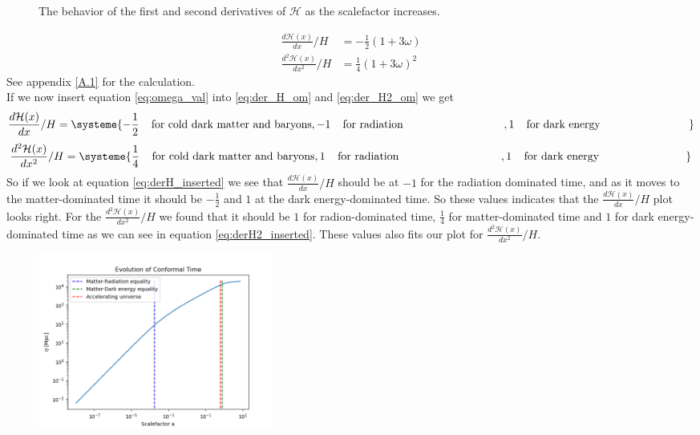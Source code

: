 \documentclass{article}
\begin{document}
\begin{multicols}{2}
\begin{figure}[H]
	\caption{The behavior of the first and second derivatives of $\mathcal{H}$ as the scalefactor increases.}
	\label{fig:der_Hp(x)}
\end{figure}
\begin{align}
    \frac{d\mathcal{H}(x)}{dx}/H&=-\frac{1}{2}(1+3\omega) \label{eq:der_H_om}\\
    \frac{d^2\mathcal{H}(x)}{dx^2}/H&=\frac{1}{4}(1+3\omega)^2 \label{eq:der_H2_om}
\end{align}
See appendix \eqref{A.1} for the calculation.\\
If we now insert equation \eqref{eq:omega_val} into \eqref{eq:der_H_om} and \eqref{eq:der_H2_om} we get
\begin{equation}
\frac{d\mathcal{H}(x)}{dx}/H=
\systeme{
  -\frac{1}{2}\;\;\;\; \text{for cold dark matter and baryons},
  -1\;\;\;\; \text{for radiation} \;\;\;\;\;\;\;\;\;\;\;\;\;\;\;\;\;\;\;\;\;\;\;\;\;\;\;\;\;\;\;\;\;,
  1\;\;\;\; \text{for dark energy}\;\;\;\;\;\;\;\;\;\;\;\;\;\;\;\;\;\;\;\;\;\;\;\;\;\;\;\;\;
} \label{eq:derH_inserted}
\end{equation}
\begin{equation}
\frac{d^2\mathcal{H}(x)}{dx^2}/H=
\systeme{
  \frac{1}{4}\;\;\;\; \text{for cold dark matter and baryons},
  1\;\;\;\; \text{for radiation} \;\;\;\;\;\;\;\;\;\;\;\;\;\;\;\;\;\;\;\;\;\;\;\;\;\;\;\;\;\;\;\;\;,
  1\;\;\;\; \text{for dark energy}\;\;\;\;\;\;\;\;\;\;\;\;\;\;\;\;\;\;\;\;\;\;\;\;\;\;\;\;
} \label{eq:derH2_inserted}
\end{equation}
So if we look at equation \eqref{eq:derH_inserted} we see that $\frac{d\mathcal{H}(x)}{dx}/H$ should be at $-1$ for the radiation dominated time, and as it moves to the matter-dominated time it should be $-\frac{1}{2}$ and $1$ at the dark energy-dominated time. So these values indicates that the $\frac{d\mathcal{H}(x)}{dx}/H$ plot looks right. For the $\frac{d^2\mathcal{H}(x)}{dx^2}/H$ we found that it should be $1$ for radion-dominated time, $\frac{1}{4}$ for matter-dominated time and $1$ for dark energy-dominated time as we can see in equation \eqref{eq:derH2_inserted}. These values also fits our plot for $\frac{d^2\mathcal{H}(x)}{dx^2}/H$.  
\begin{figure}[H]
	\centering
	\includegraphics[width=77mm]{Evolution of Conformal Time.png}

\end{figure}
\end{multicols}
\end{document}
